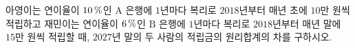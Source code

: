아영이는 연이율이 $10\mkern3mu \%$인 $\mathrm{A}$ 은행에 $1$년마다 복리로 $2018$년부터 매년 초에 $10$만 원씩 적립하고 재민이는 연이율이 $6\mkern3mu \%$인 $\mathrm{B}$ 은행에 $1$년마다 복리로 $2018$년부터 매년 말에 $15$만 원씩 적립할 때, $2027$년 말의 두 사람의 적립금의 원리합계의 차를 구하시오. 
